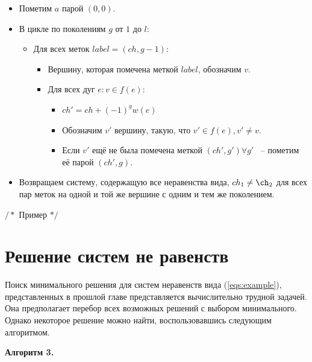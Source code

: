 \documentclass[14pt]{mmcs-article}
\begin{document}
\begin{itemize}
    \item Пометим $a$ парой $(0, 0)$.
    \item В цикле по поколениям $g$ от $1$ до $l$:
      \begin{itemize}
      \item Для всех меток $label = (ch, g - 1)$:
        \begin{itemize}
        \item Вершину, которая помечена меткой $label$, обозначим $v$.
        \item Для всех дуг $e: v \in f(e)$:
          \begin{itemize}
          \item $ch' = ch + (-1)^{g} w(e)$
          \item Обозначим $v'$ вершину, такую, что $v' \in f(e), v' \neq v$.
          \item Если $v'$ ещё не была помечена меткой $(ch', g') \forall g'$ ~-- пометим её парой $(ch', g)$.
          \end{itemize}
        \end{itemize}
      \end{itemize}
    \item Возвращаем систему, содержащую все неравенства вида, $ch_1 \neq \ch_2$ для всех пар меток на одной и той же вершине с одним и тем же поколением.
\end{itemize}

$/*$ Пример $*/$

\section*{Решение систем не равенств}

Поиск минимального решения для систем неравенств вида (\ref{eqs:example}), представленных в прошлой главе представляется вычислительно трудной задачей. Она предполагает перебор всех возможных решений с выбором минимального. Однако некоторое решение можно найти, воспользовавшись следующим алгоритмом.

\textbf{Алгоритм 3.}
\end{document}

